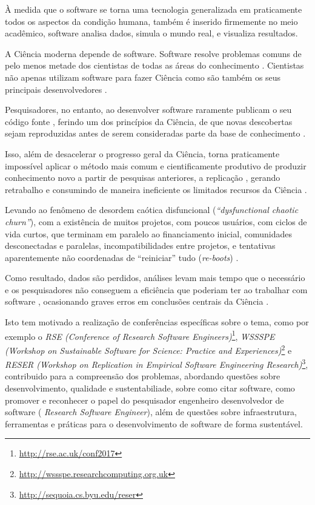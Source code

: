 {À medida que o software se torna uma tecnologia generalizada em praticamente
todos os aspectos da condição humana, também é inserido firmemente no meio
acadêmico, software analisa dados, simula o mundo real, e visualiza
resultados.}

A Ciência moderna depende de software. Software resolve problemas comuns de
pelo menos metade dos cientistas de todas as áreas do conhecimento
\cite{wilson2014best}. Cientistas não apenas utilizam software para fazer Ciência como são também
os seus principais desenvolvedores
\cite{goble2014better}.

Pesquisadores, no entanto, ao desenvolver software raramente publicam o
seu código fonte \cite{robles2010replicating, amann2015software}, ferindo um dos
princípios da Ciência, de que novas descobertas sejam reproduzidas antes de
serem consideradas parte da base de conhecimento \cite{stodden2009enabling}.

Isso, além de desacelerar o progresso geral da Ciência, torna praticamente
impossível aplicar o método mais comum e cientificamente produtivo de produzir
conhecimento novo a partir de pesquisas anteriores, a replicação
\cite{king1995replication, stodden2010reproducible}, gerando retrabalho e
consumindo de maneira ineficiente os limitados recursos da Ciência
\cite{howison2013incentives, katz2014transitive}.

Levando ao fenômeno de desordem caótica disfuncional ({\it ``dysfunctional
chaotic churn''}), com a existência de muitos projetos, com poucos
usuários, com ciclos de vida curtos, que terminam em paralelo ao financiamento
inicial, comunidades desconectadas e paralelas, incompatibilidades entre
projetos, e tentativas aparentemente não coordenadas de ``reiniciar'' tudo
({\it re-boots}) \cite{howison2015understanding}.

Como resultado, dados são perdidos,
análises levam mais tempo que o necessário e os pesquisadores não conseguem a
eficiência que poderiam ter ao trabalhar com software
\cite{wilson2017good},
ocasionando graves erros em conclusões centrais da Ciência \cite{merali2010computational}.


Isto tem motivado a realização de conferências específicas sobre o tema,
como por exemplo o {\it RSE (Conference of Research
Software Engineers)}\footnote{ \url{http://rse.ac.uk/conf2017}}, {\it WSSSPE
(Workshop on Sustainable Software for Science: Practice and
Experiences)}\footnote{ \url{http://wssspe.researchcomputing.org.uk}} e {\it
RESER (Workshop on Replication in Empirical Software Engineering
Research)}\footnote{ \url{http://sequoia.cs.byu.edu/reser}}, contribuido para
a compreensão dos problemas, abordando questões sobre desenvolvimento,
qualidade e sustentabiliade, sobre como citar software, como promover e
reconhecer o papel do pesquisador engenheiro desenvolvedor de software ({\it
Research Software Engineer}), além de questões sobre infraestrutura,
ferramentas e práticas para o desenvolvimento de software de forma sustentável.

